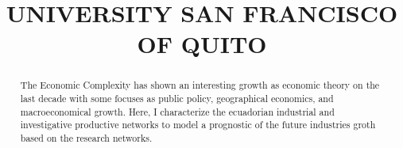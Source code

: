 \documentclass[12pt]{article}
\title{UNIVERSITY SAN FRANCISCO OF QUITO}
\begin{document}
\maketitle
\begin{abstract}
    The Economic Complexity has shown an interesting growth 
    as economic theory on the last decade with some focuses
    as public policy, geographical economics, and macroeconomical
    growth. Here, I characterize the ecuadorian industrial and 
    investigative productive networks to model a prognostic of 
    the future industries groth based on the research networks.
\end{abstract}
\end{document}
